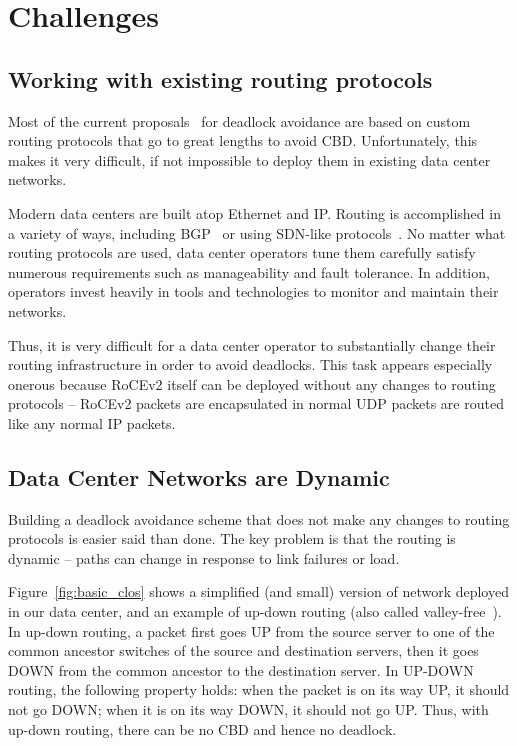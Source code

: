 \section{Challenges}
\label{sec:challenges}

\subsection{Working with existing routing protocols}
\label{sec:incremental}

Most of the current proposals~\cite{tcpbolt, karol2003prevention,
sancho2004,lash,wu2003fault} for deadlock avoidance are based on custom routing
protocols that go to great lengths to avoid CBD.  Unfortunately, this makes it
very difficult, if not impossible to deploy them in existing data center
networks. 

Modern data centers are built atop Ethernet and IP. Routing is accomplished in a
variety of ways, including BGP~\cite{vl2, facebookrouting} or using SDN-like
protocols~\cite{singh2015jupiter}.  No matter what routing protocols are used,
data center operators tune them carefully satisfy numerous requirements such as
manageability and fault tolerance.  In addition, operators invest heavily in
tools and technologies to monitor and maintain their networks.

Thus, it is very difficult for a data center operator to substantially change their routing
infrastructure in order to avoid deadlocks. This task appears especially
onerous because RoCEv2 itself can be deployed without any changes to routing
protocols -- RoCEv2 packets are encapsulated in normal UDP packets are routed
like any normal IP packets.

\subsection{Data Center Networks are Dynamic}\label{sec:reroute}

Building a deadlock avoidance scheme that does not make any changes to routing
protocols is easier said than done. The key problem is that the routing is
dynamic -- paths can change in response to link failures or load.

Figure~\ref{fig:basic_clos} shows a simplified (and small) version
of network deployed in our data center, and an example of up-down routing (also
called valley-free~\cite{qiu2007toward}).  In up-down routing, a packet first
goes UP from the source server to one of the common ancestor switches of the
source and destination servers, then it goes DOWN from the common ancestor to
the destination server.  In UP-DOWN routing, the following property holds: when
the packet is on its way UP, it should not go DOWN; when it is on its way DOWN,
it should not go UP. Thus, with up-down routing, there can be no CBD and hence
no deadlock.

